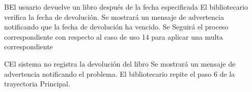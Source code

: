 		\begin{UCtrayectoriaA}{B}{El usuario devuelve un libro después de la fecha especificada}
			\UCpaso[\UCactor] El bibliotecario verifica la fecha de devolución.
			\UCpaso[\UCsist] Se mostrará un mensaje de advertencia notificando que la fecha de devolución ha vencido. 
			\UCpaso[\UCsist] Se Seguirá el proceso correspondiente con respecto al caso de uso 14  para aplicar una multa correspondiente
		\end{UCtrayectoriaA}


		\begin{UCtrayectoriaA}{C}{El sistema no registra la devolución del libro}
			\UCpaso[\UCsist] Se mostrará un mensaje de advertencia notificando el problema. 
			\UCpaso[\UCactor]El bibliotecario repite el paso 6 de la trayectoria Principal.
		\end{UCtrayectoriaA}
